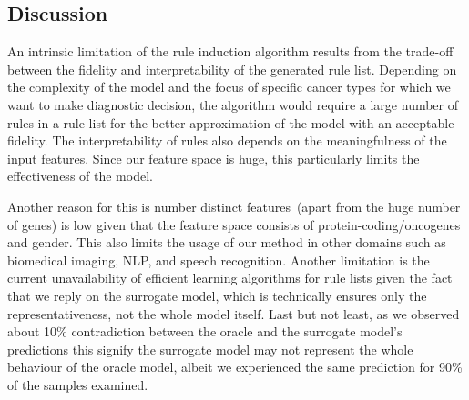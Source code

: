 \subsection{Discussion} \label{chapter_8:discussion}
An intrinsic limitation of the rule induction algorithm results from the trade-off between the fidelity and interpretability of the generated rule list. Depending on the complexity of the model and the focus of specific cancer types for which we want to make diagnostic decision, the algorithm would require a large number of rules in a rule list for the better  approximation of the model with an acceptable fidelity. The interpretability of rules also depends on the meaningfulness of the input features. Since our feature space is huge, this particularly limits the effectiveness of the model. 

\hspace*{3.5mm} Another reason for this is number distinct features~(apart from the huge number of genes) is low given that the feature space consists of protein-coding/oncogenes and gender. This also limits the usage of our method in other domains such as biomedical imaging, NLP, and speech recognition. Another limitation is the current unavailability of efficient learning algorithms for rule lists given the fact that we reply on the surrogate model, which is technically ensures only the representativeness, not the whole model itself. Last but not least, as we observed about 10\% contradiction between the oracle and the surrogate model's predictions this signify the surrogate model may not represent the whole behaviour of the oracle model, albeit we experienced the same prediction for 90\% of the samples examined. 

